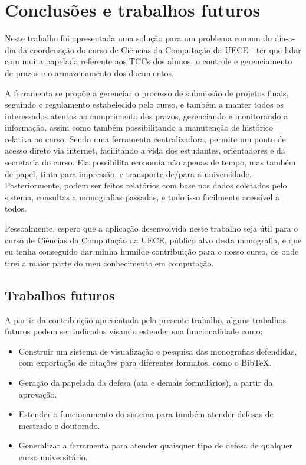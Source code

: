 \chapter{Conclusões e trabalhos futuros}
\label{cha:conclusoes}

Neste trabalho foi apresentada uma solução para um problema comum do dia-a-dia
da coordenação do curso de Ciências da Computação da UECE - ter que lidar com
muita papelada referente aos TCCs dos alunos, o controle e gerenciamento de prazos
e o armazenamento dos documentos.

A ferramenta se propõe a gerenciar o processo de submissão de projetos finais, seguindo
o regulamento estabelecido pelo curso, e também a manter todos os interessados atentos ao cumprimento
dos prazos, gerenciando e monitorando a informação, assim como também possibilitando
a manutenção de histórico relativa ao curso. Sendo uma ferramenta centralizadora,
permite um ponto de acesso direto via internet, facilitando a vida dos estudantes,
orientadores e da secretaria do curso. Ela possibilita economia não apenas de tempo,
mas também de papel, tinta para impressão, e transporte de/para a universidade.
Posteriormente, podem ser feitos relatórios com base nos dados coletados pelo sistema,
consultas a monografias passadas, e tudo isso facilmente acessível a todos.

Pessoalmente, espero que a aplicação desenvolvida neste trabalho seja útil
para o curso de Ciências da Computação da UECE, público alvo desta monografia, 
e que eu tenha conseguido dar minha humilde contribuição para o nosso curso,
de onde tirei a maior parte do meu conhecimento em computação.

\section{Trabalhos futuros}
A partir da contribuição apresentada pelo presente trabalho, alguns
trabalhos futuros podem ser indicados visando estender sua funcionalidade como:

\begin{itemize}
\item Construir um sistema de visualização e pesquisa das monografias defendidas, 
com exporta\-ção de citações para diferentes formatos, como o {\sc Bib}\TeX.
\item Geração da papelada da defesa (ata e demais formulários), a partir da aprovação.
\item Estender o funcionamento do sistema para também atender defesas de mestrado e doutorado.
\item Generalizar a ferramenta para atender quaisquer tipo de defesa de qualquer curso universitário.
\end{itemize}
